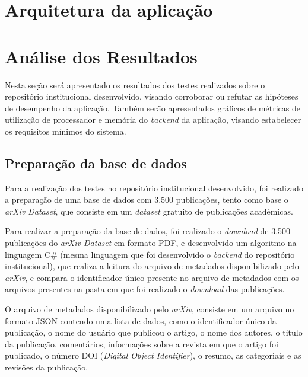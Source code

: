 \section{Arquitetura da aplicação}


\section{Análise dos Resultados}

Nesta seção será apresentado os resultados dos testes realizados
sobre o repositório institucional desenvolvido, visando corroborar ou refutar
as hipóteses de desempenho da aplicação. Também serão apresentados gráficos de
métricas de utilização de processador e memória do \emph{backend} da aplicação,
visando estabelecer os requisitos mínimos do sistema.

\subsection{Preparação da base de dados}

Para a realização dos testes no repositório institucional desenvolvido,
foi realizado a preparação de uma base de dados com 3.500 publicações,
tento como base o \emph{arXiv Dataset}, que consiste em um \emph{dataset}
gratuito de publicações acadêmicas.

Para realizar a preparação da base de dados, foi realizado o \emph{download} de
3.500 publicações do \emph{arXiv Dataset} em formato PDF, e desenvolvido um algoritmo
na linguagem C\# (mesma linguagem que foi desenvolvido o \emph{backend} do repositório
institucional), que realiza a leitura do arquivo de metadados disponibilizado pelo \emph{arXiv},
e compara o identificador único presente no arquivo de metadados com os arquivos presentes
na pasta em que foi realizado o \emph{download} das publicações.

O arquivo de metadados disponibilizado pelo \emph{arXiv}, consiste em um arquivo no formato
JSON contendo uma lista de dados, como o identificador único da publicação, o nome do usuário
que publicou o artigo, o nome dos autores, o titulo da publicação, comentários, informações sobre
a revista em que o artigo foi publicado, o número DOI (\emph{Digital Object Identifier}), o resumo,
as categoriais e as revisões da publicação.


